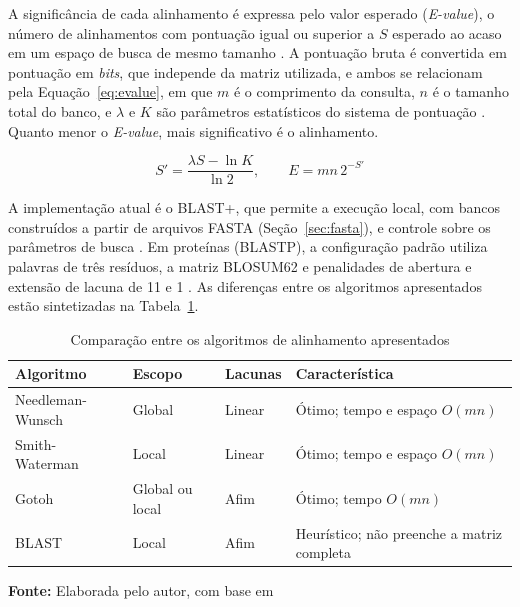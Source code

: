 A significância de cada alinhamento é expressa pelo valor esperado (\textit{E-value}), o número de alinhamentos com pontuação igual ou superior a $S$ esperado ao acaso em um espaço de busca de mesmo tamanho \cite{Karlin1990}. A pontuação bruta é convertida em pontuação em \textit{bits}, que independe da matriz utilizada, e ambos se relacionam pela Equação~\ref{eq:evalue}, em que $m$ é o comprimento da consulta, $n$ é o tamanho total do banco, e $\lambda$ e $K$ são parâmetros estatísticos do sistema de pontuação \cite{Karlin1990, Altschul1997}. Quanto menor o \textit{E-value}, mais significativo é o alinhamento.

\begin{equation}
	S' = \frac{\lambda S - \ln K}{\ln 2}, \qquad E = m n \, 2^{-S'}
	\label{eq:evalue}
\end{equation}

A implementação atual é o BLAST+, que permite a execução local, com bancos construídos a partir de arquivos FASTA (Seção~\ref{sec:fasta}), e controle sobre os parâmetros de busca \cite{Camacho2009}. Em proteínas (BLASTP), a configuração padrão utiliza palavras de três resíduos, a matriz BLOSUM62 e penalidades de abertura e extensão de lacuna de 11 e 1 \cite{Altschul1997, Camacho2009}. As diferenças entre os algoritmos apresentados estão sintetizadas na Tabela~\ref{tab:algoritmos}.

\FloatBarrier
\begin{table}[!htbp]
	\centering
	\SingleSpacing\small
	\caption{Comparação entre os algoritmos de alinhamento apresentados}
	\begin{tabularx}{\textwidth}{@{}lllX@{}}
		\toprule
		\textbf{Algoritmo} & \textbf{Escopo} & \textbf{Lacunas} & \textbf{Característica} \\
		\midrule
		Needleman-Wunsch & Global           & Linear          & Ótimo; tempo e espaço $O(mn)$ \\
		Smith-Waterman   & Local            & Linear          & Ótimo; tempo e espaço $O(mn)$ \\
		Gotoh            & Global ou local  & Afim            & Ótimo; tempo $O(mn)$ \\
		BLAST            & Local            & Afim            & Heurístico; não preenche a matriz completa \\
		\bottomrule
	\end{tabularx}
	\par\vspace{0.2cm}
	\textbf{Fonte:} Elaborada pelo autor, com base em 
	\label{tab:algoritmos}
\end{table}
\FloatBarrier

